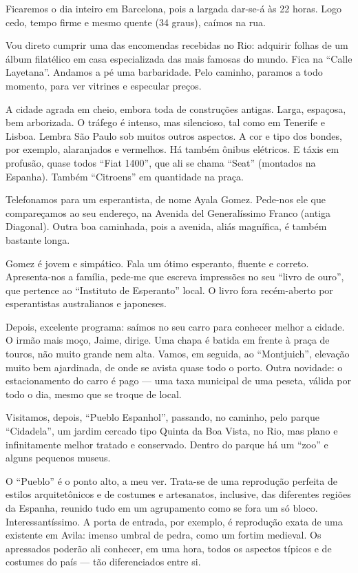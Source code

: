 Ficaremos o dia inteiro em Barcelona, pois a largada dar-se-á às 22 horas. Logo cedo, tempo firme e mesmo quente (34 graus), caímos na rua.

Vou direto cumprir uma das encomendas recebidas no Rio: adquirir folhas de um álbum filatélico em casa especializada das mais famosas do mundo. Fica na ``Calle Layetana''. Andamos a pé uma barbaridade. Pelo caminho, paramos a todo momento, para ver vitrines e especular preços.

A cidade agrada em cheio, embora toda de construções antigas. Larga, espaçosa, bem arborizada. O tráfego é intenso, mas silencioso, tal como em Tenerife e Lisboa. Lembra São Paulo sob muitos outros aspectos. A cor e tipo dos bondes, por exemplo, alaranjados e vermelhos. Há também ônibus elétricos. E táxis em profusão, quase todos ``Fiat 1400'', que ali se chama ``Seat'' (montados na Espanha). Também ``Citroens'' em quantidade na praça.

Telefonamos para um esperantista, de nome Ayala Gomez. Pede-nos ele que compareçamos ao seu endereço, na Avenida del Generalíssimo Franco (antiga Diagonal). Outra boa caminhada, pois a avenida, aliás magnífica, é também bastante longa.

Gomez é jovem e simpático. Fala um ótimo esperanto, fluente e correto. Apresenta-nos a família, pede-me que escreva impressões no seu ``livro de ouro'', que pertence ao ``Instituto de Esperanto'' local. O livro fora recém-aberto por esperantistas australianos e japoneses.

Depois, excelente programa: saímos no seu carro para conhecer melhor a cidade. O irmão mais moço, Jaime, dirige. Uma chapa é batida em frente à praça de touros, não muito grande nem alta. Vamos, em seguida, ao ``Montjuich'', elevação muito bem ajardinada, de onde se avista quase todo o porto. Outra novidade: o estacionamento do carro é pago --- uma taxa municipal de uma peseta, válida por todo o dia, mesmo que se troque de local.

Visitamos, depois, ``Pueblo Espanhol'', passando, no caminho, pelo parque ``Cidadela'', um jardim cercado tipo Quinta da Boa Vista, no Rio, mas plano e infinitamente melhor tratado e conservado. Dentro do parque há um ``zoo'' e alguns pequenos museus.

O ``Pueblo'' é o ponto alto, a meu ver. Trata-se de uma reprodução perfeita de estilos arquitetônicos e de costumes e artesanatos, inclusive, das diferentes regiões da Espanha, reunido tudo em um agrupamento como se fora um só bloco. Interessantíssimo. A porta de entrada, por exemplo, é reprodução exata de uma existente em Avila: imenso umbral de pedra, como um fortim medieval. Os apressados poderão ali conhecer, em uma hora, todos os aspectos típicos e de costumes do país --- tão diferenciados entre si.

